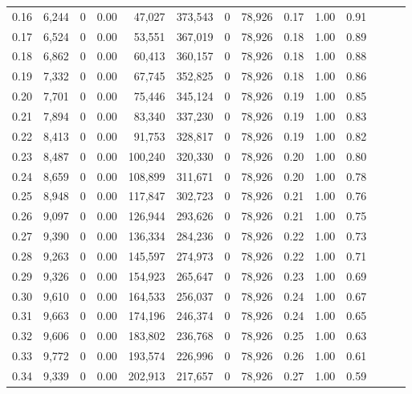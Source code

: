\begin{tabular}{rrrrrrrrrrrrrr}
0.16 &  6,244 &      0 &  0.00 &   47,027 &  373,543 &       0 &  78,926 &  0.17 &  1.00 &      0.91 \\
0.17 &  6,524 &      0 &  0.00 &   53,551 &  367,019 &       0 &  78,926 &  0.18 &  1.00 &      0.89 \\
0.18 &  6,862 &      0 &  0.00 &   60,413 &  360,157 &       0 &  78,926 &  0.18 &  1.00 &      0.88 \\
0.19 &  7,332 &      0 &  0.00 &   67,745 &  352,825 &       0 &  78,926 &  0.18 &  1.00 &      0.86 \\
0.20 &  7,701 &      0 &  0.00 &   75,446 &  345,124 &       0 &  78,926 &  0.19 &  1.00 &      0.85 \\
0.21 &  7,894 &      0 &  0.00 &   83,340 &  337,230 &       0 &  78,926 &  0.19 &  1.00 &      0.83 \\
0.22 &  8,413 &      0 &  0.00 &   91,753 &  328,817 &       0 &  78,926 &  0.19 &  1.00 &      0.82 \\
0.23 &  8,487 &      0 &  0.00 &  100,240 &  320,330 &       0 &  78,926 &  0.20 &  1.00 &      0.80 \\
0.24 &  8,659 &      0 &  0.00 &  108,899 &  311,671 &       0 &  78,926 &  0.20 &  1.00 &      0.78 \\
0.25 &  8,948 &      0 &  0.00 &  117,847 &  302,723 &       0 &  78,926 &  0.21 &  1.00 &      0.76 \\
0.26 &  9,097 &      0 &  0.00 &  126,944 &  293,626 &       0 &  78,926 &  0.21 &  1.00 &      0.75 \\
0.27 &  9,390 &      0 &  0.00 &  136,334 &  284,236 &       0 &  78,926 &  0.22 &  1.00 &      0.73 \\
0.28 &  9,263 &      0 &  0.00 &  145,597 &  274,973 &       0 &  78,926 &  0.22 &  1.00 &      0.71 \\
0.29 &  9,326 &      0 &  0.00 &  154,923 &  265,647 &       0 &  78,926 &  0.23 &  1.00 &      0.69 \\
0.30 &  9,610 &      0 &  0.00 &  164,533 &  256,037 &       0 &  78,926 &  0.24 &  1.00 &      0.67 \\
0.31 &  9,663 &      0 &  0.00 &  174,196 &  246,374 &       0 &  78,926 &  0.24 &  1.00 &      0.65 \\
0.32 &  9,606 &      0 &  0.00 &  183,802 &  236,768 &       0 &  78,926 &  0.25 &  1.00 &      0.63 \\
0.33 &  9,772 &      0 &  0.00 &  193,574 &  226,996 &       0 &  78,926 &  0.26 &  1.00 &      0.61 \\
0.34 &  9,339 &      0 &  0.00 &  202,913 &  217,657 &       0 &  78,926 &  0.27 &  1.00 &      0.59 \\

\end{tabular}
